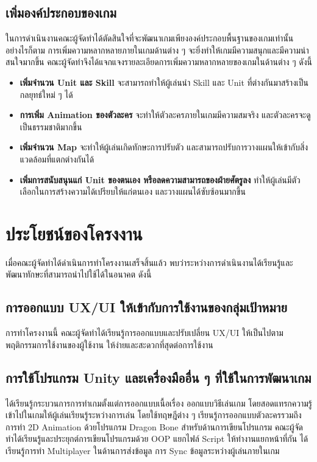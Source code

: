 \documentclass[12pt,oneside,openright,a4paper]{cpe-thai-project}
\begin{document}
    \subsection{เพิ่มองค์ประกอบของเกม}
    ในการดำเนินงานคณะผู้จัดทำได้ตัดสินใจที่จะพัฒนาเกมเพียงองค์ประกอบพื้นฐานของเกมเท่านั้น อย่างไรก็ตาม 
    การเพิ่มความหลากหลายภายในเกมด้านต่าง ๆ จะยิ่งทำให้เกมมีความสนุกและมีความน่าสนใจมากขึ้น 
    คณะผู้จัดทำจึงได้แจกแจงรายละเอียดการเพิ่มความหลากหลายของเกมในด้านต่าง ๆ ดังนี้

    \begin{itemize}
      \item \textbf{เพิ่มจำนวน Unit และ Skill} จะสามารถทำให้ผู้เล่นนำ Skill และ Unit ที่ต่างกันมาสร้างเป็นกลยุทธ์ใหม่ ๆ ได้
      \item \textbf{การเพิ่ม Animation ของตัวละคร} จะทำให้ตัวละครภายในเกมมีความสมจริง และตัวละครจะดูเป็นธรรมชาติมากขึ้น
      \item \textbf{เพิ่มจำนวน Map} จะทำให้ผู้เล่นเกิดทักษะการปรับตัว และสามารถปรับการวางแผนให้เข้ากับสิ่งแวดล้อมที่แตกต่างกันได้
      \item \textbf{เพิ่มการสนับสนุนแก่ Unit ของตนเอง หรือลดความสามารถของฝ่ายศัตรูลง} ทำให้ผู้เล่นมีตัวเลือกในการสร้างความได้เปรียบให้แก่ตนเอง 
      และวางแผนได้ซับซ้อนมากขึ้น
    \end{itemize}

  \pagebreak
  \section{ประโยชน์ของโครงงาน}
  เมื่อคณะผู้จัดทำได้ดำเนินการทำโครงงานเสร็จสิ้นแล้ว พบว่าระหว่างการดำเนินงานได้เรียนรู้และพัฒนาทักษะที่สามารถนำไปใช้ได้ในอนาคต ดังนี้
    \subsection{การออกแบบ UX/UI ให้เข้ากับการใช้งานของกลุ่มเป้าหมาย}
    การทำโครงงานนี้ คณะผู้จัดทำได้เรียนรู้การออกแบบและปรับเปลี่ยน UX/UI ให้เป็นไปตามพฤติกรรมการใช้งานของผู้ใช้งาน 
    ให้ง่ายและสะดวกที่สุดต่อการใช้งาน

    \subsection{การใช้โปรแกรม Unity และเครื่องมืออื่น ๆ ที่ใช้ในการพัฒนาเกม}
    ได้เรียนรู้กระบวนการการทำเกมตั้งแต่การออกแบบเนื้อเรื่อง ออกแบบวิธีเล่นเกม 
    โดยสอดแทรกความรู้เข้าไปในเกมให้ผู้เล่นเรียนรู้ระหว่างการเล่น โดยใช้ทฤษฎีต่าง ๆ 
    เรียนรู้การออกแบบตัวละครรวมถึงการทำ 2D Animation ด้วยโปรแกรม Dragon Bone 
    สำหรับด้านการเขียนโปรแกรม คณะผู้จัดทำได้เรียนรู้และประยุกต์การเขียนโปรแกรมด้วย OOP 
    แยกไฟล์ Script ให้ทำงานแยกหน้าที่กัน ได้เรียนรู้การทำ Multiplayer ในด้านการส่งข้อมูล 
    การ Sync ข้อมูลระหว่างผู้เล่นภายในเกม
\end{document}

